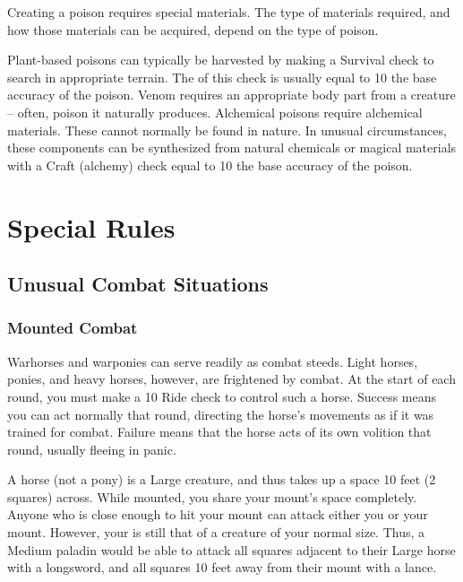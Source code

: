         Creating a poison requires special materials.
        The type of materials required, and how those materials can be acquired, depend on the type of poison.

        \begin{itemize}
             Plant-based poisons can typically be harvested by making a Survival check to search in appropriate terrain.
                The  of this check is usually equal to 10 \add the base accuracy of the poison.
             Venom requires an appropriate body part from a creature -- often, poison it naturally produces.
             Alchemical poisons require alchemical materials.
                These cannot normally be found in nature.
                In unusual circumstances, these components can be synthesized from natural chemicals or magical materials with a Craft (alchemy) check equal to 10 \add the base accuracy of the poison.
        \end{itemize}

\section{Special Rules}

    \subsection{Unusual Combat Situations}

        \subsubsection{Mounted Combat}\label{Mounted Combat}
             Warhorses and warponies can serve readily as combat steeds. Light horses, ponies, and heavy horses, however, are frightened by combat.
            At the start of each round, you must make a  10 Ride check to control such a horse.
            Success means you can act normally that round, directing the horse's movements as if it was trained for combat.
            Failure means that the horse acts of its own volition that round, usually fleeing in panic.

             A horse (not a pony) is a Large creature, and thus takes up a space 10 feet (2 squares) across. While mounted, you share your mount's space completely. Anyone who is close enough to hit your mount can attack either you or your mount. However, your  is still that of a creature of your normal size. Thus, a Medium paladin would be able to attack all squares adjacent to their Large horse with a longsword, and all squares 10 feet away from their mount with a lance.

